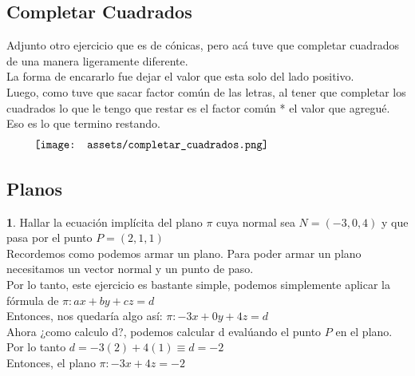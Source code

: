 \documentclass[10pt,a4paper]{article}
\begin{document}
\subsection*{Completar Cuadrados}
Adjunto otro ejercicio que es de cónicas, pero acá tuve que completar cuadrados de una manera ligeramente diferente. \\
La forma de encararlo fue dejar el valor que esta solo del lado positivo. \\
Luego, como tuve que sacar factor común de las letras, al tener que completar los cuadrados lo que le tengo que restar es el factor común * el valor que agregué. Eso es lo que termino restando. 
\[\begin{minipage}[b]{0.9\textwidth}
    \texttt{[image: assets/completar\_cuadrados.png]}
\end{minipage}\]
\subsection*{Planos}
\label{subsec:ejercicios_planos}
\textbf{1}. Hallar la ecuación implícita del plano $\pi$ cuya normal sea $N=(-3, 0, 4)$ y que pasa por el punto $P=(2, 1, 1)$ \\
Recordemos como podemos armar un plano. Para poder armar un plano necesitamos un vector normal y un punto de paso. \\
Por lo tanto, este ejercicio es bastante simple, podemos simplemente aplicar la fórmula de $\pi:ax+by+cz = d$ \\
Entonces, nos quedaría algo así: $ \pi:-3x + 0y + 4z = d$ \\
Ahora ¿como calculo d?, podemos calcular d evalúando el punto $P$ en el plano. \\
Por lo tanto $d=-3(2) + 4(1) \equiv d = -2$ \\
Entonces, el plano $\pi:-3x+4z=-2$ \\
\end{document}

